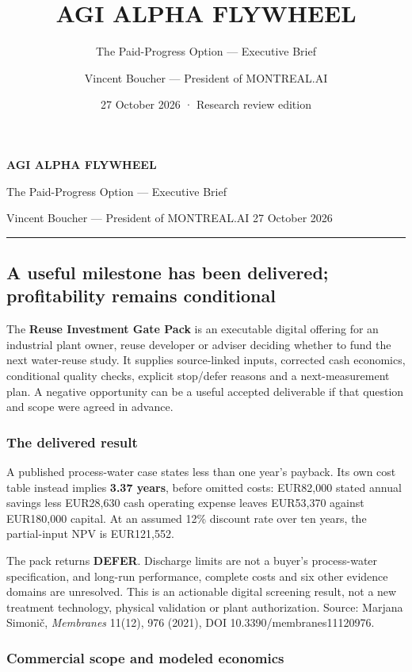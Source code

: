 \documentclass[
  10pt,
  letterpaper,
]{article}
\title{AGI ALPHA FLYWHEEL}
\subtitle{The Paid-Progress Option --- Executive Brief}
\author{Vincent Boucher --- President of MONTREAL.AI}
\date{27 October 2026 · Research review edition}
\renewcommand{\maketitle}{%
{\color{deepPurple}\sffamily\Large\bfseries AGI ALPHA FLYWHEEL}\par
\vspace{4pt}
{\color{deepPurple}\sffamily\large The Paid-Progress Option --- Executive Brief}\par
\vspace{5pt}
{\sffamily\small Vincent Boucher --- President of MONTREAL.AI \hfill 27 October 2026}\par
\vspace{8pt}\hrule\vspace{8pt}
}
\begin{document}
\maketitle

\hypertarget{a-useful-milestone-has-been-delivered-profitability-remains-conditional}{%
\subsection{A useful milestone has been delivered; profitability remains
conditional}\label{a-useful-milestone-has-been-delivered-profitability-remains-conditional}}

The \textbf{Reuse Investment Gate Pack} is an executable digital
offering for an industrial plant owner, reuse developer or adviser
deciding whether to fund the next water-reuse study. It supplies
source-linked inputs, corrected cash economics, conditional quality
checks, explicit stop/defer reasons and a next-measurement plan. A
negative opportunity can be a useful accepted deliverable if that
question and scope were agreed in advance.

\hypertarget{the-delivered-result}{%
\subsubsection{The delivered result}\label{the-delivered-result}}

A published process-water case states less than one year's payback. Its
own cost table instead implies \textbf{3.37 years}, before omitted
costs: EUR82,000 stated annual savings less EUR28,630 cash operating
expense leaves EUR53,370 against EUR180,000 capital. At an assumed 12\%
discount rate over ten years, the partial-input NPV is EUR121,552.

The pack returns \textbf{DEFER}. Discharge limits are not a buyer's
process-water specification, and long-run performance, complete costs
and six other evidence domains are unresolved. This is an actionable
digital screening result, not a new treatment technology, physical
validation or plant authorization. Source: Marjana Simonič,
\emph{Membranes} 11(12), 976 (2021), DOI 10.3390/membranes11120976.

\hypertarget{commercial-scope-and-modeled-economics}{%
\subsubsection{Commercial scope and modeled
economics}\label{commercial-scope-and-modeled-economics}}
\end{document}
